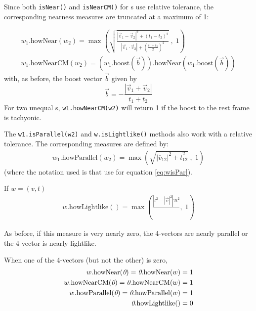 Since both {\tt isNear()} and {\tt isNearCM()} for \LV s use relative tolerance,
the corresponding nearness measures are truncated at a maximum of 1:

\begin{eqnarray}
\label{eq:whowNear}
  w_1 \mbox{.howNear} (w_2) = \max \left( \sqrt { \frac
    {\left| \vec{v}_1 - \vec{v}_2 \right| ^2 + (t_1 - t_2)^2 }
    { \left| \vec{v}_1 \cdot \vec{v}_2 \right|
      + \left( \frac{t_1 + t_2}{2} \right)^2 }
  } \;, \; 1 \right)
	\\
\label{eq:whowNearCM}
  w_1 \mbox{.howNearCM} (w_2) =
    \left( w_1\mbox{.boost}(\vec{b}) \right)\mbox{.howNear}
    \left( w_1\mbox{.boost}(\vec{b}) \right)
\end{eqnarray}
\noindent
with, as before, the boost vector $\vec{b}$ given by
\[
  \vec{b} = - \frac { \left| \vec{v}_1 + \vec{v}_2 \right| } { t_1 + t_2 }
\]
\noindent
For two unequal \LV s,
{\tt w1.howNearCM(w2)} will return 1
if the boost to the rest frame is tachyonic.

The {\tt w1.isParallel(w2)}
and {\tt w.isLightlike()}
methods also work with a relative tolerance.
The corresponding measures are defined by:
\begin{eqnarray}
\label{eq:whowPar}
  w_1\mbox{.howParallel}(w_2) = \max \left( \sqrt {
    \left| \overline{v}_{12} \right| ^2 +
	\overline{t}_{12}^2 } \; , \; 1 \right)
\end{eqnarray}
\noindent
(where the notation used is that use for equation \ref{eq:wisPar}).

\noindent
If $w = (v,t)$
\begin{eqnarray}
\label{eq:whowLl}
  w\mbox{.howLightlike}() = \max \left(
    \frac { \left| t^2 - |\vec{v}|^2 \right| { 2 t^2 }
    } \; , \; 1 \right)
\end{eqnarray}

\noindent
As before, if this measure is very nearly zero, the 4-vectors are nearly
parallel or the 4-vector is nearly lightlike.

When one of the 4-vectors (but not the other) is zero,
\begin{eqnarray}
\label{eq:whowNear:2}
  w \mbox{.howNear}(\mbox{{\it 0}}) =
  \mbox{{\it 0}} \mbox{.howNear} (w) = 1
	\\
\label{eq:whowNearCM:2}
  w \mbox{.howNearCM}(\mbox{{\it 0}}) =
  \mbox{{\it 0}} \mbox{.howNearCM} (w) = 1
	\\
\label{eq:whowPar:2}
  w \mbox{.howParallel}(\mbox{{\it 0}}) =
  \mbox{{\it 0}} \mbox{.howParallel} (w) = 1
	\\
\label{eq:whowLl:2}
  \mbox{{\it 0}} \mbox{.howLightlike()} = 0
\end{eqnarray}


